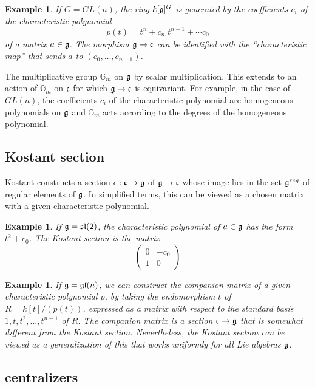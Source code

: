 \documentclass[brochure,english,12pt]{bourbaki}
\newtheorem{example}[equation]{Example}
\newcommand{\ring}[1]{\mathbb{#1}}
\def\gl{\frak{gl}}
\def\sl{\frak{sl}}
\def\g{\frak{g}}
\def\cc{\frak{c}}
\begin{document}
\begin{example}
If $G=GL(n)$, the ring $k[\g]^G$ is generated by the coefficients $c_i$ of the characteristic
polynomial 
\begin{equation}
p(t)=t^n + c_{n_1} t^{n-1} +\cdots c_0
\end{equation}
of a matrix $a\in \g$.  The morphism $\g\to\cc$ can be identified with
the ``characteristic map'' that sends $a$ to $(c_0,\ldots,c_{n-1})$.
\end{example}

The multiplicative group $\ring{G}_m$ on $\g$ by scalar multiplication.  This extends to an action
of $\ring{G}_m$ on $\cc$ for which $\g\to\cc$ is equivariant.  For example, in
the case of $GL(n)$, the coefficients $c_i$ of the characteristic
polynomial are homogeneous polynomials on $\g$ and $\ring{G}_m$ acts
according to the degrees of the homogeneous polynomial.

\subsection{Kostant section}

Kostant constructs a section $\epsilon:\cc\to\g$ of $\g\to\cc$ whose image lies in the set $\g^{reg}$ 
of regular elements
of $\g$.  In simplified terms, this can be viewed as a chosen matrix with a given characteristic polynomial.


\begin{example}
If $\g=\sl(2)$, the characteristic polynomial of $a\in\g$ has the form $t^2  +c_0$.
The Kostant section is the matrix
\[
\begin{pmatrix} 0 & -c_0\\ 1 & 0\end{pmatrix}
\]
\end{example}


\begin{example}
  If $\g=\gl(n)$, we can construct the companion matrix of a given
  characteristic polynomial $p$, by taking the endomorphism $t$ of
  $R=k[t]/(p(t))$, expressed as a matrix with respect to the standard
  basis $1,t,t^2,\ldots,t^{n-1}$ of $R$.  The companion matrix is a
  section $\cc\to\g$ that is somewhat different from the Kostant
  section.  Nevertheless, the Kostant section can be viewed as a
  generalization of this that works uniformly for all Lie algebras
  $\g$.
\end{example}


\subsection{centralizers}
\end{document}
